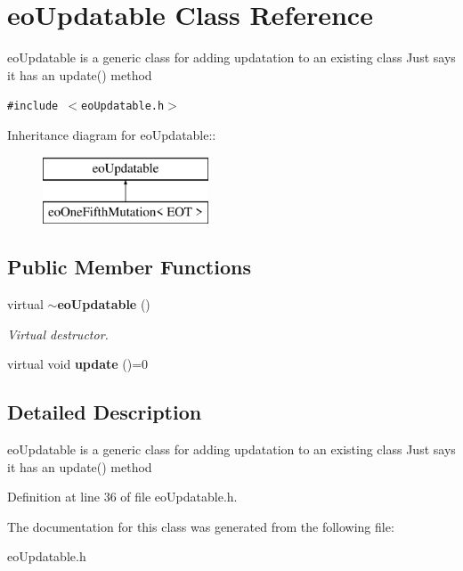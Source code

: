 \section{eo\-Updatable Class Reference}
\label{classeo_updatable}
eo\-Updatable is a generic class for adding updatation to an existing class Just says it has an update() method  


{\tt \#include $<$eo\-Updatable.h$>$}

Inheritance diagram for eo\-Updatable::\begin{figure}[H]
\begin{center}
\leavevmode
\includegraphics[height=2cm]{classeo_updatable}
\end{center}
\end{figure}
\subsection*{Public Member Functions}
\begin{CompactItemize}
\item 
virtual {\bf $\sim$eo\-Updatable} ()\label{classeo_updatable_a0}

\begin{CompactList}\small\item\em Virtual destructor. \item\end{CompactList}\item 
virtual void {\bf update} ()=0\label{classeo_updatable_a1}

\end{CompactItemize}


\subsection{Detailed Description}
eo\-Updatable is a generic class for adding updatation to an existing class Just says it has an update() method 



Definition at line 36 of file eo\-Updatable.h.

The documentation for this class was generated from the following file:\begin{CompactItemize}
\item 
eo\-Updatable.h\end{CompactItemize}
